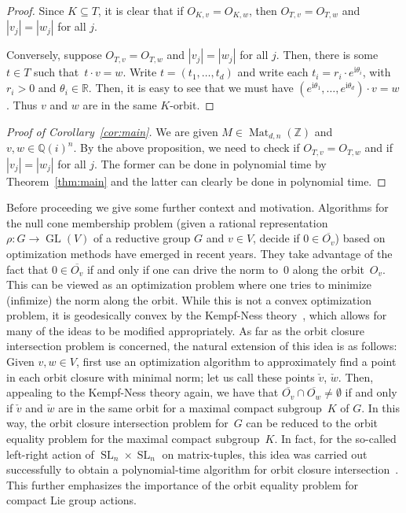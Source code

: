 \documentclass[10pt,a4paper]{article}
\DeclareMathOperator{\GL}{GL}
\DeclareMathOperator{\SL}{SL}
\DeclareMathOperator{\Mat}{Mat}
\theoremstyle{definition}
\numberwithin{equation}{section}
\newcommand{\QQ}{\mathbb{Q}}
\newcommand{\ZZ}{\mathbb{Z}}
\newcommand{\RR}{\mathbb{R}}
\begin{document}
\begin{proof}
Since $K \subseteq T$, it is clear that if $O_{K,v} = O_{K,w}$, then $O_{T,v} = O_{T,w}$ and $|v_j| = |w_j|$ for all $j$.

Conversely, suppose $O_{T,v} = O_{T,w}$ and $|v_j| = |w_j|$ for all $j$.
Then, there is some $t \in T$ such that~$t \cdot v = w$.
Write $t = (t_1,\dots,t_d)$ and write each $t_i = r_i \cdot e^{\mathrm i \theta_i}$, with $r_i > 0$ and $\theta_i \in \RR$.
Then, it is easy to see that we must have $(e^{\mathrm i \theta_1},\dots,e^{\mathrm i \theta_d}) \cdot v = w$.
Thus $v$ and $w$ are in the same $K$-orbit. 
\end{proof}

\begin{proof} [Proof of Corollary~\ref{cor:main}]
We are given $M \in \Mat_{d,n}(\ZZ)$ and $v,w \in \QQ(i)^n$.
%
By the above proposition, we need to check if $O_{T,v} = O_{T,w}$ and if $|v_j| = |w_j|$ for all $j$.
The former can be done in polynomial time by Theorem~\ref{thm:main} and the latter can clearly be done in polynomial time.
\end{proof}

Before proceeding we give some further context and motivation.
Algorithms for the null cone membership problem (given a rational representation $\rho:G \rightarrow \GL(V)$ of a reductive group $G$ and $v \in V$, decide if $0 \in \overline{O_v}$) based on optimization methods have emerged in recent years.
They take advantage of the fact that $0 \in \overline{O_v}$ if and only if one can drive the norm to~$0$ along the orbit~$O_v$.
This can be viewed as an optimization problem where one tries to minimize (infimize) the norm along the orbit.
While this is not a convex optimization problem, it is geodesically convex by the Kempf-Ness theory~\cite{KN:78}, which allows for many of the ideas to be modified appropriately.
As far as the orbit closure intersection problem is concerned, the natural extension of this idea is as follows:
Given $v,w \in V$, first use an optimization algorithm to approximately find a point in each orbit closure with minimal norm;
let us call these points $\check{v}$, $\check{w}$.
Then, appealing to the Kempf-Ness theory again, we have that $\overline{O_v} \cap \overline{O_w} \neq \emptyset$ if and only if $\check{v}$ and $\check{w}$ are in the same orbit for a maximal compact subgroup~$K$ of $G$.
In this way, the orbit closure intersection problem for~$G$ can be reduced to the orbit equality problem for the maximal compact subgroup~$K$.
In fact, for the so-called left-right action of $\SL_n \times \SL_n$ on matrix-tuples, this idea was carried out successfully to obtain a polynomial-time algorithm for orbit closure intersection~\cite{AZGLOW}.
This further emphasizes the importance of the orbit equality problem for compact Lie group actions.
\end{document}
